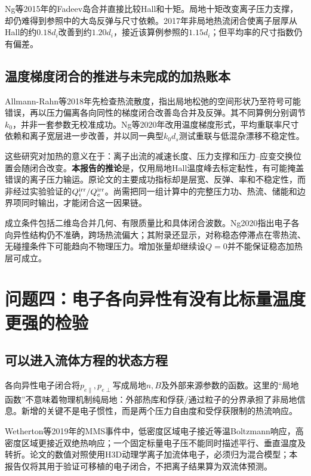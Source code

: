 Ng等2015年的Fadeev岛合并直接比较Hall和十矩。局地十矩改变离子压力支撑，却仍难得到参照中的大岛反弹与尺寸依赖。2017年非局地热流闭合使离子层厚从Hall的约$0.18d_i$改善到约$1.20d_i$，接近该算例参照的$1.15d_i$；但平均率的尺寸指数仍有偏差。\citep{Ng2015,Ng2017}

\subsection{温度梯度闭合的推进与未完成的加热账本}
Allmann-Rahn等2018年先检查热流散度，指出局地松弛的空间形状乃至符号可能错误，再以压力偏离各向同性的梯度闭合改善岛合并及反弹。其不同算例分别调节$k_0$，并非一套参数无校准成功。Ng等2020年改用温度梯度形式，平均重联率尺寸依赖和离子宽层进一步改善，并以同一典型$k_0d_s$测试重联与低混杂漂移不稳定性。\citep{L256,Ng2020}

这些研究对加热的意义在于：离子出流的减速长度、压力支撑和压力--应变交换位置会随闭合改变。\textbf{本报告的推论}是，仅用局地Hall温度峰去标定黏性，有可能掩盖错误的离子压力输运。原论文的主要成功指标却是层宽、反弹、率和不稳定性，而非经过实验验证的$Q_i^{\rm irr}/Q_e^{\rm irr}$。尚需把同一组计算中的完整压力功、热流、储能和边界项同时输出，才能闭合这一因果链。

成立条件包括二维岛合并几何、有限质量比和具体闭合波数。Ng2020指出电子各向异性结构仍不准确，跨场热流偏大；其附录还显示，对称稳态停滞点在零热流、无碰撞条件下可能趋向不物理压力。增加张量却继续设$Q=0$并不能保证稳态加热层可成立。

\section{问题四：电子各向异性有没有比标量温度更强的检验}
\subsection{可以进入流体方程的状态方程}
各向异性电子闭合将$p_{e\parallel},p_{e\perp}$写成局地$n,B$及外部来源参数的函数。这里的“局地函数”不意味着物理机制纯局地：外部热库和俘获/通过粒子的分界承担了非局地信息。新增的关键不是电子惯性，而是两个压力自由度和受俘获限制的热流响应。

Wetherton等2019年的MMS事件中，低密度区域电子接近等温Boltzmann响应，高密度区域更接近双绝热响应；一个固定标量电子压不能同时描述平行、垂直温度及转折。论文的数值对照使用H3D动理学离子加流体电子，必须归为混合模型；本报告仅将其用于验证可移植的电子闭合，不把离子结果算为双流体预测。\citep{Wetherton2019}

